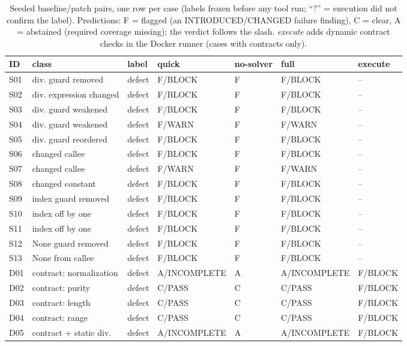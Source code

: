 \begin{table}[h!]
\centering
\small

\caption{Seeded baseline/patch pairs, one row per case (labels frozen before any tool run; ``?'' = execution did not confirm the label). Predictions: F = flagged (an INTRODUCED/CHANGED failure finding), C = clear, A = abstained (required coverage missing); the verdict follows the slash. \emph{execute} adds dynamic contract checks in the Docker runner (cases with contracts only).}
\label{tab:seeded-cases}
\begin{tabular}{lllllll}
\toprule
ID & class & label & quick & no-solver & full & execute \\
\midrule
S01 & div. guard removed & defect & F/BLOCK & F & F/BLOCK & -- \\
S02 & div. expression changed & defect & F/BLOCK & F & F/BLOCK & -- \\
S03 & div. guard weakened & defect & F/BLOCK & F & F/BLOCK & -- \\
S04 & div. guard weakened & defect & F/WARN & F & F/WARN & -- \\
S05 & div. guard reordered & defect & F/BLOCK & F & F/BLOCK & -- \\
S06 & changed callee & defect & F/BLOCK & F & F/BLOCK & -- \\
S07 & changed callee & defect & F/WARN & F & F/WARN & -- \\
S08 & changed constant & defect & F/BLOCK & F & F/BLOCK & -- \\
S09 & index guard removed & defect & F/BLOCK & F & F/BLOCK & -- \\
S10 & index off by one & defect & F/BLOCK & F & F/BLOCK & -- \\
S11 & index off by one & defect & F/BLOCK & F & F/BLOCK & -- \\
S12 & None guard removed & defect & F/BLOCK & F & F/BLOCK & -- \\
S13 & None from callee & defect & F/BLOCK & F & F/BLOCK & -- \\
D01 & contract: normalization & defect & A/INCOMPLETE & A & A/INCOMPLETE & F/BLOCK \\
D02 & contract: purity & defect & C/PASS & C & C/PASS & F/BLOCK \\
D03 & contract: length & defect & C/PASS & C & C/PASS & F/BLOCK \\
D04 & contract: range & defect & C/PASS & C & C/PASS & F/BLOCK \\
D05 & contract + static div. & defect & A/INCOMPLETE & A & A/INCOMPLETE & F/BLOCK \\

\end{tabular}
\end{table}
